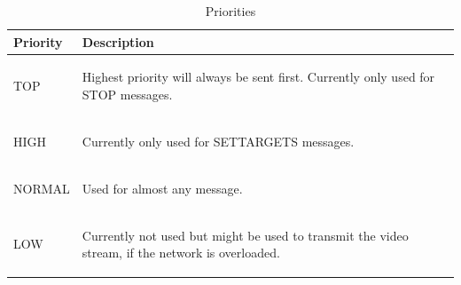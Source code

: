 \documentclass[]{scrreprt}
\begin{document}
	
	\begin{table}
		
		\begin{tabular}{|l|l|}
			\hline 
			Priority & Description \\ 
			\hline \hline
			TOP & 
			\begin{pbox}{11.0cm}{\vspace{.2\baselineskip}
					Highest priority will always be sent first. Currently only used for STOP messages.
					\vspace{.3\baselineskip}}
			\end{pbox}\\
			\hline 
			HIGH &
			\begin{pbox}{11.0cm}{\vspace{.2\baselineskip}
					Currently only used for SETTARGETS messages.
					\vspace{.3\baselineskip}}
			\end{pbox}\\ 
			\hline 
			NORMAL &
			\begin{pbox}{11.0cm}{\vspace{.2\baselineskip}
					Used for almost any message.
					\vspace{.3\baselineskip}}
			\end{pbox}\\
			\hline 
			LOW &
			\begin{pbox}{11.0cm}{\vspace{.2\baselineskip}
					Currently not used but might be used to transmit the video stream, if the network is overloaded.
					\vspace{.3\baselineskip}}
			\end{pbox}\\
			\hline 
		\end{tabular}
		\caption{Priorities} \label{tab:prio}		
	\end{table}
\end{document}
